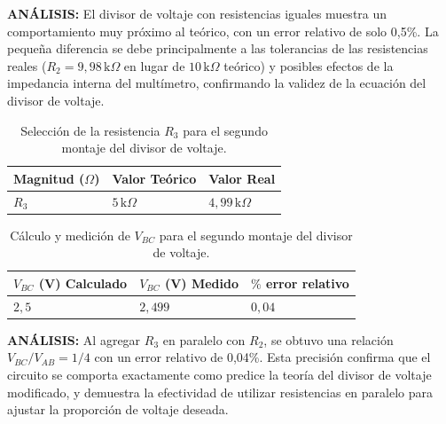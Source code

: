 \documentclass[12pt,a4paper]{article}
\begin{document}
\textbf{ANÁLISIS:} El divisor de voltaje con resistencias iguales muestra un comportamiento muy próximo al teórico, con un error relativo de solo 0,5\%. La pequeña diferencia se debe principalmente a las tolerancias de las resistencias reales ($R_2 = 9,98\,\mathrm{k}\Omega$ en lugar de $10\,\mathrm{k}\Omega$ teórico) y posibles efectos de la impedancia interna del multímetro, confirmando la validez de la ecuación del divisor de voltaje.
\bigskip

\begin{table}[H]
    \centering
    \fontsize{10pt}{12pt}\selectfont
    \renewcommand{\arraystretch}{1.2}
    \setlength{\tabcolsep}{6pt}
    {
    \begin{tabular}{|C{3cm}|C{3cm}|C{3cm}|}
    \hline
    \textbf{Magnitud ($\Omega$)} & \textbf{Valor Teórico} & \textbf{Valor Real}\\
    \hline
    $R_3$ & $5\,\mathrm{k}\Omega$ & $4{,}99\,\mathrm{k}\Omega$ \\
    \hline
    \end{tabular}}
\caption{Selección de la resistencia $R_3$ para el segundo montaje del divisor de voltaje.}
\label{tab:divisor-voltaje-r3}
\end{table}

\begin{table}[H]
    \centering
    \fontsize{10pt}{12pt}\selectfont
    \renewcommand{\arraystretch}{1.2}
    \setlength{\tabcolsep}{6pt}
    {
    \begin{tabular}{|C{4cm}|C{4cm}|C{4cm}|}
    \hline
    \textbf{$V_{BC}$ (V) Calculado} & \textbf{$V_{BC}$ (V) Medido} & \textbf{$\%$ error relativo} \\
    \hline
    $2{,}5$ & $2{,}499$ & $0{,}04$ \\
    \hline
\end{tabular}}
\caption{Cálculo y medición de $V_{BC}$ para el segundo montaje del divisor de voltaje.}
\label{tab:divisor-voltaje-vbc-2}
\end{table}

\textbf{ANÁLISIS:} Al agregar $R_3$ en paralelo con $R_2$, se obtuvo una relación $V_{BC}/V_{AB} = 1/4$ con un error relativo de 0,04\%. Esta precisión confirma que el circuito se comporta exactamente como predice la teoría del divisor de voltaje modificado, y demuestra la efectividad de utilizar resistencias en paralelo para ajustar la proporción de voltaje deseada.
\end{document}
